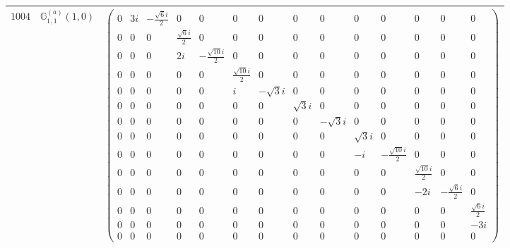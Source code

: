 \documentclass[fleqn,8pt,landscape]{jsarticle}
\begin{document}
\begin{center}
\begin{longtable}{ccc}
$ 1004 $ & $ \mathbb{G}_{1,1}^{(a)}(1,0) $ & $ \begin{pmatrix} 0 & 3 i & - \frac{\sqrt{6} i}{2} & 0 & 0 & 0 & 0 & 0 & 0 & 0 & 0 & 0 & 0 & 0 \\ 0 & 0 & 0 & \frac{\sqrt{6} i}{2} & 0 & 0 & 0 & 0 & 0 & 0 & 0 & 0 & 0 & 0 \\ 0 & 0 & 0 & 2 i & - \frac{\sqrt{10} i}{2} & 0 & 0 & 0 & 0 & 0 & 0 & 0 & 0 & 0 \\ 0 & 0 & 0 & 0 & 0 & \frac{\sqrt{10} i}{2} & 0 & 0 & 0 & 0 & 0 & 0 & 0 & 0 \\ 0 & 0 & 0 & 0 & 0 & i & - \sqrt{3} i & 0 & 0 & 0 & 0 & 0 & 0 & 0 \\ 0 & 0 & 0 & 0 & 0 & 0 & 0 & \sqrt{3} i & 0 & 0 & 0 & 0 & 0 & 0 \\ 0 & 0 & 0 & 0 & 0 & 0 & 0 & 0 & - \sqrt{3} i & 0 & 0 & 0 & 0 & 0 \\ 0 & 0 & 0 & 0 & 0 & 0 & 0 & 0 & 0 & \sqrt{3} i & 0 & 0 & 0 & 0 \\ 0 & 0 & 0 & 0 & 0 & 0 & 0 & 0 & 0 & - i & - \frac{\sqrt{10} i}{2} & 0 & 0 & 0 \\ 0 & 0 & 0 & 0 & 0 & 0 & 0 & 0 & 0 & 0 & 0 & \frac{\sqrt{10} i}{2} & 0 & 0 \\ 0 & 0 & 0 & 0 & 0 & 0 & 0 & 0 & 0 & 0 & 0 & - 2 i & - \frac{\sqrt{6} i}{2} & 0 \\ 0 & 0 & 0 & 0 & 0 & 0 & 0 & 0 & 0 & 0 & 0 & 0 & 0 & \frac{\sqrt{6} i}{2} \\ 0 & 0 & 0 & 0 & 0 & 0 & 0 & 0 & 0 & 0 & 0 & 0 & 0 & - 3 i \\ 0 & 0 & 0 & 0 & 0 & 0 & 0 & 0 & 0 & 0 & 0 & 0 & 0 & 0 \end{pmatrix} $ \\ \hline

\end{longtable}
\end{center}
\end{document}
